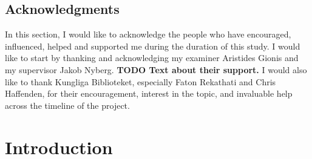 \documentclass[english, bibtex]{kththesis}
\begin{document}
\cleardoublepage

\section*{Acknowledgments }

In this section, I would like to acknowledge the people who have encouraged, influenced, helped and supported me during the duration of this study.
    I would like to start by thanking and acknowledging my examiner Aristides Gionis and my supervisor Jakob Nyberg. \textbf{TODO Text about their support.} I would also like to thank Kungliga Biblioteket, especially Faton Rekathati and Chris Haffenden, for their encouragement, interest in the topic, and invaluable help across the timeline of the project. 
    
\acknowlegmentssignature

\renewcommand{\chaptermark}[1]{ \markboth{#1}{}} 
\tableofcontents
  \markboth{\contentsname}{}

\cleardoublepage
\listoffigures

\cleardoublepage

\listoftables
\cleardoublepage
\glsaddall
\printglossary[type=\acronymtype, title={List of acronyms and abbreviations}]
\label{pg:lastPageofPreface}
\mainmatter
\glsresetall
\renewcommand{\chaptermark}[1]{\markboth{#1}{}}
\chapter{Introduction}
\label{ch:introduction}
\end{document}
